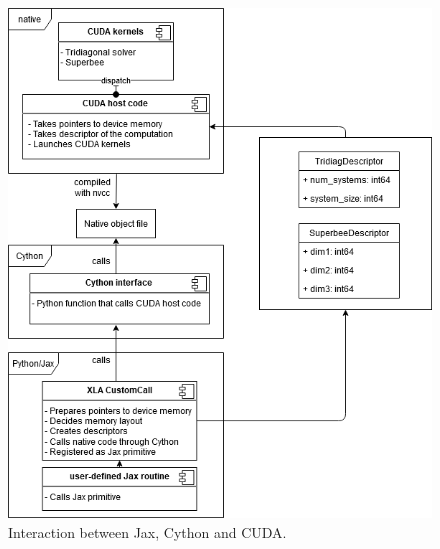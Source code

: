 \documentclass[a4paper,oneside]{memoir}
\begin{document}
\begin{figure}[h]
    \centering
    \includegraphics[width=\textwidth]{integration.png}
    \caption{Interaction between Jax, Cython and CUDA.}
    \label{fig:integration}
\end{figure}






\end{document}
